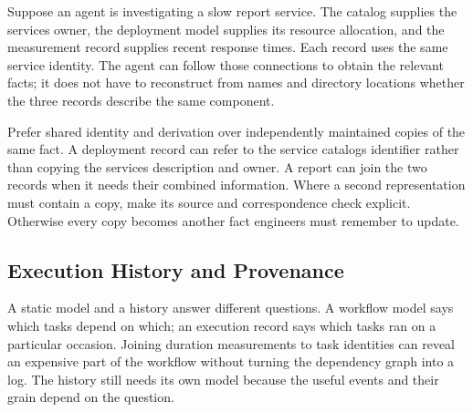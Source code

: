 
Suppose an agent is investigating a slow report service. The catalog supplies the service\textquotesingle s owner, the deployment model supplies its resource allocation, and the measurement record supplies recent response times. Each record uses the same service identity. The agent can follow those connections to obtain the relevant facts; it does not have to reconstruct from names and directory locations whether the three records describe the same component.



Prefer shared identity and derivation over independently maintained copies of the same fact. A deployment record can refer to the service catalog\textquotesingle s identifier rather than copying the service\textquotesingle s description and owner. A report can join the two records when it needs their combined information. Where a second representation must contain a copy, make its source and correspondence check explicit. Otherwise every copy becomes another fact engineers must remember to update.

\subsection{Execution History and Provenance}\label{heading:execution-history-and-provenance}


A static model and a history answer different questions. A workflow model says which tasks depend on which; an execution record says which tasks ran on a particular occasion. Joining duration measurements to task identities can reveal an expensive part of the workflow without turning the dependency graph into a log. The history still needs its own model because the useful events and their grain depend on the question.

